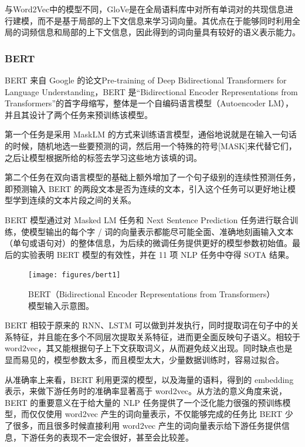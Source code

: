 \documentclass[a4paper]{zreport}
\begin{document}
与Word2Vec中的模型不同，GloVe是在全局语料库中对所有单词对的共现信息进行建模，而不是基于局部的上下文信息来学习词向量。其优点在于能够同时利用全局的词频信息和局部的上下文信息，因此得到的词向量具有较好的语义表示能力。

\subsubsection{BERT}

BERT 来自 Google 的论文Pre-training of Deep Bidirectional Transformers for Language Understanding，BERT 是“Bidirectional Encoder Representations from Transformers”的首字母缩写，整体是一个自编码语言模型（Autoencoder LM），并且其设计了两个任务来预训练该模型。

第一个任务是采用 MaskLM 的方式来训练语言模型，通俗地说就是在输入一句话的时候，随机地选一些要预测的词，然后用一个特殊的符号[MASK]来代替它们，之后让模型根据所给的标签去学习这些地方该填的词。

第二个任务在双向语言模型的基础上额外增加了一个句子级别的连续性预测任务，即预测输入 BERT 的两段文本是否为连续的文本，引入这个任务可以更好地让模型学到连续的文本片段之间的关系。

BERT 模型通过对 Masked LM 任务和 Next Sentence Prediction 任务进行联合训练，使模型输出的每个字 / 词的向量表示都能尽可能全面、准确地刻画输入文本（单句或语句对）的整体信息，为后续的微调任务提供更好的模型参数初始值。最后的实验表明 BERT 模型的有效性，并在 11 项 NLP 任务中夺得 SOTA 结果。

\begin{figure}[t]
\centering
\texttt{[image: figures/bert1]}
\caption{BERT（Bidirectional Encoder Representations from Transformers）模型输入示意图。}
\label{fig:bert1}
\end{figure}

BERT 相较于原来的 RNN、LSTM 可以做到并发执行，同时提取词在句子中的关系特征，并且能在多个不同层次提取关系特征，进而更全面反映句子语义。相较于 word2vec，其又能根据句子上下文获取词义，从而避免歧义出现。同时缺点也是显而易见的，模型参数太多，而且模型太大，少量数据训练时，容易过拟合。

从准确率上来看，BERT 利用更深的模型，以及海量的语料，得到的 embedding 表示，来做下游任务时的准确率显著高于 word2vec。从方法的意义角度来说，BERT 的重要意义在于给大量的 NLP 任务提供了一个泛化能力很强的预训练模型，而仅仅使用 word2vec 产生的词向量表示，不仅能够完成的任务比 BERT 少了很多，而且很多时候直接利用 word2vec 产生的词向量表示给下游任务提供信息，下游任务的表现不一定会很好，甚至会比较差。
\end{document}
